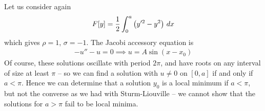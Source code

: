 \documentclass{../template/note}
\begin{document}
    \begin{example*}
        Let us consider again
        \begin{align*}
            F[y] = \frac 1 2 \int_0^a \left(y'^2-y^2\right) \,d{x}
        \end{align*}
        which gives $\rho = 1$, $\sigma = -1$. The Jacobi accessory equation is
        \begin{align*}
            -u''-u=0 \implies u = A \sin (x-x_0)
        \end{align*}
        Of course, these solutions oscillate with period $2\pi$, and have roots on any interval of size at least $\pi$ -- so we can find a solution with $u \neq 0$ on $[0, a]$ if and only if $a < \pi$. Hence we can determine that a solution $y_0$ is a local minimum if $a < \pi$, but not the converse as we had with Sturm-Liouville -- we cannot show that the solutions for $a > \pi$ fail to be local minima.       
    \end{example*}
    
    
    
    
    
    
    
    
    
    
    
    
    
    
\end{document}

